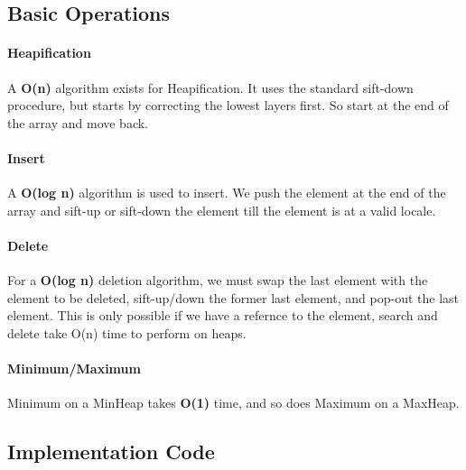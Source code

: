 \subsection{Basic Operations}

\paragraph{Heapification}
A \textbf{O(n)} algorithm exists for Heapification. It uses the standard sift-down procedure, but starts by correcting the lowest layers first. So start at the end of the array and move back.

\paragraph{Insert}
A \textbf{O(log n)} algorithm is used to insert. We push the element at the end of the array and sift-up or sift-down the element till the element is at a valid locale. 

\paragraph{Delete}
For a \textbf{O(log n)} deletion algorithm, we must swap the last element with the element to be deleted, sift-up/down the former last element, and pop-out the last element.
This is only possible if we have a refernce to the element, search and delete take O(n) time to perform on heaps.

\paragraph{Minimum/Maximum}
Minimum on a MinHeap takes \textbf{O(1)} time, and so does Maximum on a MaxHeap.

\subsection{Implementation Code}

